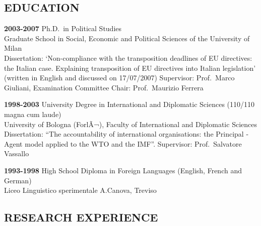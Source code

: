 \documentclass[11pt,]{article}
\renewenvironment{itemize}{
  \begin{list}{}{
    \setlength{\leftmargin}{1.5em}
  }
}{
  \end{list}
}
\begin{document}
\hypertarget{education}{%
\subsection{EDUCATION}\label{education}}

\begin{itemize}
\item
  \textbf{2003-2007} Ph.D.~in Political Studies\\
  Graduate School in Social, Economic and Political Sciences of the
  University of Milan\\
  Dissertation: `Non-compliance with the transposition deadlines of EU
  directives: the Italian case. Explaining transposition of EU
  directives into Italian legislation' (written in English and discussed
  on 17/07/2007) Supervisor: Prof.~Marco Giuliani, Examination Committee
  Chair: Prof.~Maurizio Ferrera
\item
  \textbf{1998-2003} University Degree in International and Diplomatic
  Sciences (110/110 magna cum laude)\\
  University of Bologna (ForlÃ¬), Faculty of International and
  Diplomatic Sciences\\
  Dissertation: ``The accountability of international organisations: the
  Principal -Agent model applied to the WTO and the IMF''. Supervisor:
  Prof.~Salvatore Vassallo
\item
  \textbf{1993-1998} High School Diploma in Foreign Languages (English,
  French and German)\\
  Liceo Linguistico sperimentale A.Canova, Treviso
\end{itemize}

\hypertarget{research-experience}{%
\subsection{RESEARCH EXPERIENCE}\label{research-experience}}
\end{document}

